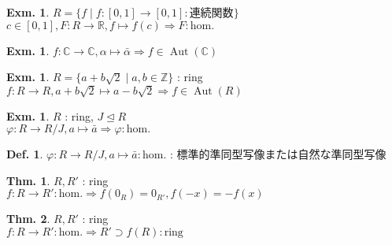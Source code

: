 \documentclass[uplatex,dvipdfmx,9pt]{beamer}
\newcommand{\Aut}[1]{\operatorname{Aut}(#1)}
\newcommand{\ideal}{\trianglelefteq}
\renewcommand{\hom}{\text{hom.}} %
\newcommand{\Z}{\mathbb{Z}}
\newcommand{\R}{\mathbb{R}}
\newcommand{\C}{\mathbb{C}}
\newcounter{textExmCount}
\theoremstyle{definition} %
\newtheorem{defn}{Def.}[subsection] %
\newtheorem{thm}{Thm.}[subsection] %
\theoremstyle{example}
\newtheorem{exmText}[textExmCount]{Exm.}
\begin{document}
    \begin{frame}

      \begin{exmText}
        $R = \{f \mid f\colon [0, 1] \to [0, 1] : \text{連続関数}\}$ \\
        $c \in [0, 1], F\colon R \to \R, f \mapsto f(c) \Rightarrow F : \hom$
      \end{exmText}

      \begin{exmText}
        $f\colon \C \to \C, \alpha \mapsto \bar{\alpha} \Rightarrow f \in \Aut{\C}$
      \end{exmText}

      \begin{exmText}
        $R = \{a + b\sqrt{2} \mid a, b \in \Z\}$ : ring \\
        $f\colon R \to R, a + b\sqrt{2} \mapsto a - b\sqrt{2} \Rightarrow f \in \Aut{R}$
      \end{exmText}
      
    \end{frame}

    \begin{frame}

      \begin{exmText}
        $R$ : ring, $J \ideal R$ \\
        $\varphi \colon R \to R/J, a \mapsto \bar{a} \Rightarrow \varphi : \hom$
      \end{exmText}

      \begin{defn}
        $\varphi \colon R \to R/J, a \mapsto \bar{a} : \hom$ : \alert{標準的準同型写像}または\alert{自然な準同型写像}
      \end{defn}

      \begin{thm}
        $R, R'$ : ring \\
        $f\colon R \to R' : \hom \Rightarrow f(0_R) = 0_{R'}, f(-x) = -f(x)$
      \end{thm}

      \begin{thm}
        $R, R'$ : ring \\
        $f\colon R \to R' : \hom \Rightarrow R' \supset f(R) : \text{ring}$
      \end{thm}
      
    \end{frame}
\end{document}
